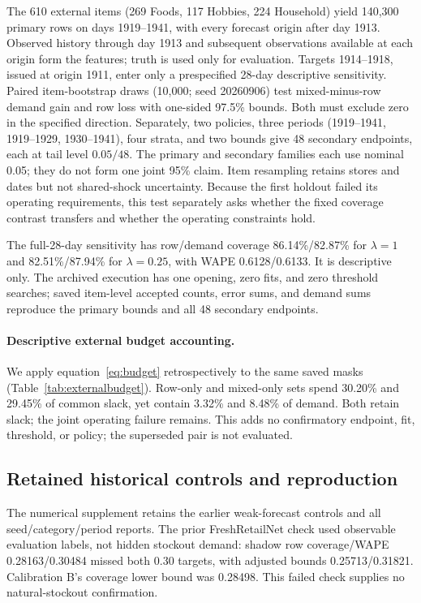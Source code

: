 The 610 external items (269 Foods, 117 Hobbies, 224 Household) yield 140,300 primary rows on days 1919--1941, with every forecast origin after day 1913. Observed history through day 1913 and subsequent observations available at each origin form the features; truth is used only for evaluation. Targets 1914--1918, issued at origin 1911, enter only a prespecified 28-day descriptive sensitivity. Paired item-bootstrap draws (10,000; seed 20260906) test mixed-minus-row demand gain and row loss with one-sided 97.5\% bounds. Both must exclude zero in the specified direction. Separately, two policies, three periods (1919--1941, 1919--1929, 1930--1941), four strata, and two bounds give 48 secondary endpoints, each at tail level $0.05/48$. The primary and secondary families each use nominal 0.05; they do not form one joint 95\% claim. Item resampling retains stores and dates but not shared-shock uncertainty. Because the first holdout failed its operating requirements, this test separately asks whether the fixed coverage contrast transfers and whether the operating constraints hold.


The full-28-day sensitivity has row/demand coverage 86.14\%/82.87\% for $\lambda=1$ and 82.51\%/87.94\% for $\lambda=0.25$, with WAPE 0.6128/0.6133. It is descriptive only. The archived execution has one opening, zero fits, and zero threshold searches; saved item-level accepted counts, error sums, and demand sums reproduce the primary bounds and all 48 secondary endpoints.

\paragraph{Descriptive external budget accounting.}
We apply equation~\eqref{eq:budget} retrospectively to the same saved masks (Table~\ref{tab:externalbudget}). Row-only and mixed-only sets spend 30.20\% and 29.45\% of common slack, yet contain 3.32\% and 8.48\% of demand. Both retain slack; the joint operating failure remains. This adds no confirmatory endpoint, fit, threshold, or policy; the superseded pair is not evaluated.


\subsection{Retained historical controls and reproduction}
\label{app:history}\label{app:legacyselection}
The numerical supplement retains the earlier weak-forecast controls and all seed/category/period reports. The prior FreshRetailNet check used observable evaluation labels, not hidden stockout demand: shadow row coverage/WAPE 0.28163/0.30484 missed both 0.30 targets, with adjusted bounds 0.25713/0.31821. Calibration B's coverage lower bound was 0.28498. This failed check supplies no natural-stockout confirmation.


